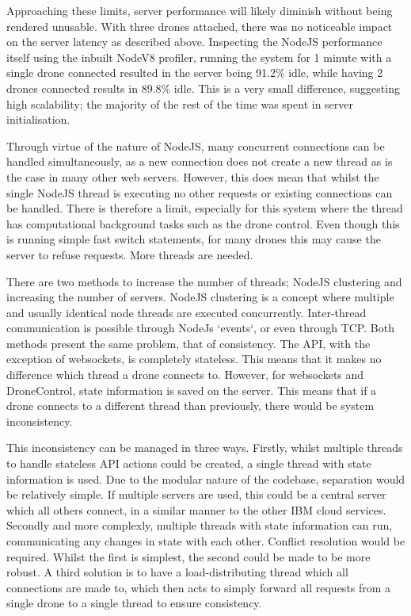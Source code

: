 \documentclass{article}
\begin{document}
Approaching these limits, server performance will likely diminish without being rendered unusable. With three drones attached, there was no noticeable impact on the server latency as described above. Inspecting the NodeJS performance itself using the inbuilt NodeV8 profiler, running the system for 1 minute with a single drone connected resulted in the server being 91.2\% idle, while having 2 drones connected results in 89.8\% idle. This is a very small difference, suggesting high scalability; the majority of the rest of the time was spent in server initialisation. 

Through virtue of the nature of NodeJS, many concurrent connections can be handled simultaneously, as a new connection does not create a new thread as is the case in many other web servers. However, this does mean that whilst the single NodeJS thread is executing no other requests or existing connections can be handled. There is therefore a limit, especially for this system where the thread has computational background tasks such as the drone control. Even though this is running simple fast switch statements, for many drones this may cause the server to refuse requests. More threads are needed.

There are two methods to increase the number of threads; NodeJS clustering and increasing the number of servers. NodeJS clustering is a concept where multiple and usually identical node threads are executed concurrently. Inter-thread communication is possible through NodeJs `events`, or even through TCP. Both methods present the same problem, that of consistency. The API, with the exception of websockets, is completely stateless. This means that it makes no difference which thread a drone connects to. However, for websockets and DroneControl, state information is saved on the server. This means that if a drone connects to a different thread than previously, there would be system inconsistency.

This inconsistency can be managed in three ways. Firstly, whilst multiple threads to handle stateless API actions could be created, a single thread with state information is used. Due to the modular nature of the codebase, separation would be relatively simple. If multiple servers are used, this could be a central server which all others connect, in a similar manner to the other IBM cloud services. Secondly and more complexly, multiple threads with state information can run, communicating any changes in state with each other. Conflict resolution would be required. Whilst the first is simplest, the second could be made to be more robust. A third solution is to have a load-distributing thread which all connections are made to, which then acts to simply forward all requests from a single drone to a single thread to ensure consistency. 
\end{document}
